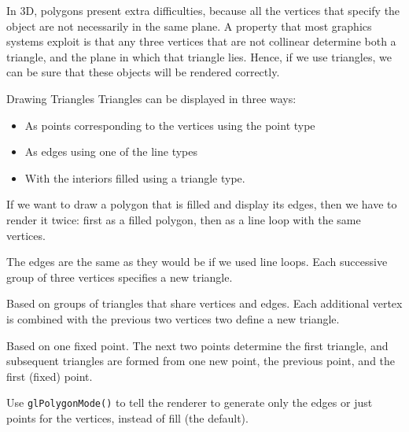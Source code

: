 \documentclass[../notes.tex]{subfiles}
\begin{document}
        In 3D, polygons present extra difficulties, because all the vertices that
        specify the object are not necessarily in the same plane.
        A property that most graphics systems exploit is that any three vertices
        that are not collinear determine both a triangle,
        and the plane in which that triangle lies.
        Hence, if we use triangles, we can be sure that these objects will be rendered correctly.

        \begin{sidenote}{Drawing Triangles}
          Triangles can be displayed in three ways:
          \begin{itemize}[nosep]
            \item As points corresponding to the vertices using the point type
            \item As edges using one of the line types
            \item With the interiors filled using a triangle type.
          \end{itemize}

          If we want to draw a polygon that is filled and display its edges,
          then we have to render it twice: first as a filled polygon,
          then as a line loop with the same vertices.
          
          \begin{descriptimize}[nosep]
            \item[Triangles (\texttt{gl.TRIANGLES})] The edges are the same
              as they would be if we used line loops.
              Each successive group of three vertices specifies a new triangle.
            \item[Triangle Strip (\texttt{gl.TRIANGLE_STRIP})]
              Based on groups of triangles that share vertices and edges.
              Each additional vertex is combined with the previous two vertices
              two define a new triangle.
            \item[Triangle Fan (\texttt{gl.TRIANGLE_FAN})]
              Based on one fixed point.
              The next two points determine the first triangle,
              and subsequent triangles are formed from one new point,
              the previous point, and the first (fixed) point.
          \end{descriptimize}

          Use \texttt{glPolygonMode()} to tell the renderer to generate
          only the edges or just points for the vertices, instead of fill (the default).
        \end{sidenote}
\end{document}
